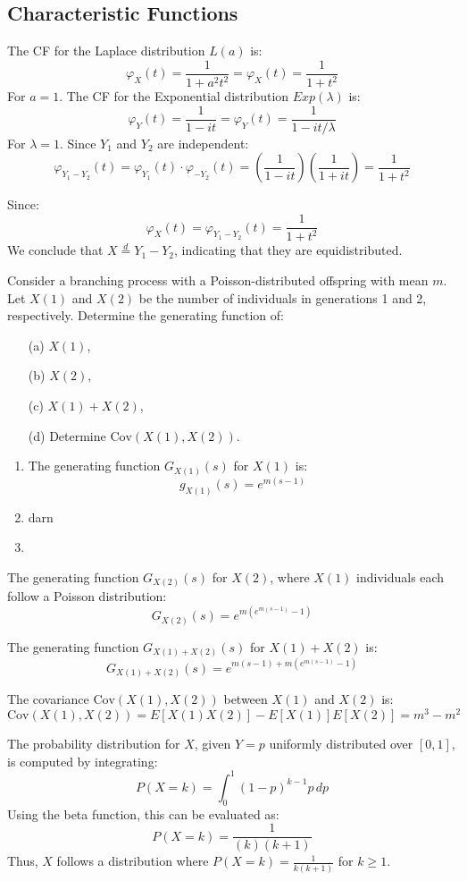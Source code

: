 \begin{enumerate}[label=(\alph*)]
\subsection*{Characteristic Functions}
The CF for the Laplace distribution $L(a)$ is:
\[
\varphi_X(t) = \frac{1}{1 + a^2 t^2} = \varphi_X(t) = \frac{1}{1 + t^2}
\]
For $a=1$. The CF for the Exponential distribution $Exp(\lambda)$ is:
\[
\varphi_Y(t) = \frac{1}{1 - it} =
\varphi_Y(t) = \frac{1}{1 - it/\lambda}
\]
For $\lambda=1$. Since $Y_1$ and $Y_2$ are independent:
\[
\varphi_{Y_1 - Y_2}(t) = \varphi_{Y_1}(t) \cdot \varphi_{-Y_2}(t) = \left(\frac{1}{1 - it}\right) \left(\frac{1}{1 + it}\right) = \frac{1}{1 + t^2}
\]

Since:
\[
\varphi_X(t) = \varphi_{Y_1 - Y_2}(t) = \frac{1}{1 + t^2}
\]
We conclude that $X \overset{d}{=} Y_1 - Y_2$, indicating that they are equidistributed.

\setcounter{problem}{42}

\problem Consider a branching process with a Poisson-distributed offspring with mean \( m \). Let \( X(1) \) and \( X(2) \) be the number of individuals in generations 1 and 2, respectively. Determine the generating function of:
\begin{itemize}
    \item[(a)] \( X(1) \),
    \item[(b)] \( X(2) \),
    \item[(c)] \( X(1) + X(2) \),
    \item[(d)] Determine \( \text{Cov}(X(1), X(2)) \).
\end{itemize}

\solution
\begin{enumerate}
    \item The generating function \( G_{X(1)}(s) \) for \( X(1) \) is:
    \[ g_{X(1)}(s) = e^{m(s-1)} \]

    \item darn
    \item 
\end{enumerate}

The generating function \( G_{X(2)}(s) \) for \( X(2) \), where \( X(1) \) individuals each follow a Poisson distribution:
\[ G_{X(2)}(s) = e^{m(e^{m(s-1)}-1)} \]

The generating function \( G_{X(1) + X(2)}(s) \) for \( X(1) + X(2) \) is:
\[ G_{X(1)+X(2)}(s) = e^{m(s-1) + m(e^{m(s-1)}-1)} \]

The covariance \( \text{Cov}(X(1), X(2)) \) between \( X(1) \) and \( X(2) \) is:
\[ \text{Cov}(X(1), X(2)) = E[X(1)X(2)] - E[X(1)]E[X(2)] = m^3 - m^2 \]
\end{enumerate}


\solution

The probability distribution for \( X \), given \( Y = p \) uniformly distributed over \([0,1]\), is computed by integrating:
\[ P(X = k) = \int_0^1 (1-p)^{k-1} p \, dp \]
Using the beta function, this can be evaluated as:
\[ P(X = k) = \frac{1}{(k)(k+1)} \]
Thus, \( X \) follows a distribution where \( P(X = k) = \frac{1}{k(k+1)} \) for \( k \geq 1 \).

